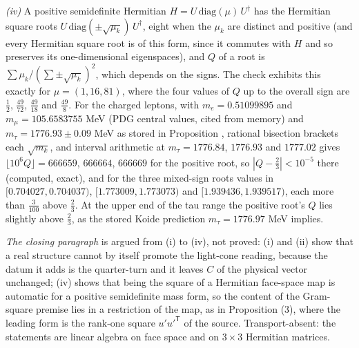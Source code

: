 \emph{(iv)} A positive semidefinite Hermitian $H = U\,\mathrm{diag}(\mu)\,U^{\dagger}$ has the Hermitian square roots $U\,\mathrm{diag}(\pm\sqrt{\mu_{k}})\,U^{\dagger}$, eight when the $\mu_{k}$ are distinct and positive (and every Hermitian square root is of this form, since it commutes with $H$ and so preserves its one-dimensional eigenspaces), and $Q$ of a root is $\sum\mu_{k}/(\sum\pm\sqrt{\mu_{k}})^{2}$, which depends on the signs. The check exhibits this exactly for $\mu = (1, 16, 81)$, where the four values of $Q$ up to the overall sign are $\tfrac12$, $\tfrac{49}{72}$, $\tfrac{49}{18}$ and $\tfrac{49}{8}$. For the charged leptons, with $m_{e} = 0.51099895$ and $m_{\mu} = 105.6583755$ MeV (PDG central values, cited from memory) and $m_{\tau} = 1776.93 \pm 0.09$ MeV as stored in Proposition , rational bisection brackets each $\sqrt{m_{k}}$, and interval arithmetic at $m_{\tau} = 1776.84$, $1776.93$ and $1777.02$ gives $\lfloor 10^{6}Q \rfloor = 666659$, $666664$, $666669$ for the positive root, so $|Q - \tfrac23| < 10^{-5}$ there (computed, exact), and for the three mixed-sign roots values in $[0.704027, 0.704037)$, $[1.773009, 1.773073)$ and $[1.939436, 1.939517)$, each more than $\tfrac{3}{100}$ above $\tfrac23$. At the upper end of the tau range the positive root's $Q$ lies slightly above $\tfrac23$, as the stored Koide prediction $m_{\tau} = 1776.97$ MeV implies.

\emph{The closing paragraph} is argued from (i) to (iv), not proved: (i) and (ii) show that a real structure cannot by itself promote the light-cone reading, because the datum it adds is the quarter-turn and it leaves $C$ of the physical vector unchanged; (iv) shows that being the square of a Hermitian face-space map is automatic for a positive semidefinite mass form, so the content of the Gram-square premise lies in a restriction of the map, as in Proposition (3), where the leading form is the rank-one square $u'u'^{\mathsf{T}}$ of the source. Transport-absent: the statements are linear algebra on face space and on $3 \times 3$ Hermitian matrices.

